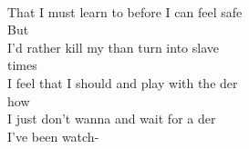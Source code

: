   \\
\songwordfb{} That I must learn to  before I can feel \songwordfb{} safe \\
But  \\
\songwordfb{} I'd rather kill my than turn into  slave \\
times \\
\songwordfb{} I feel that I should  and play with the der \\
how \\
\songwordfb{} I just don't wanna  and wait for a der \\
I've been watch-


